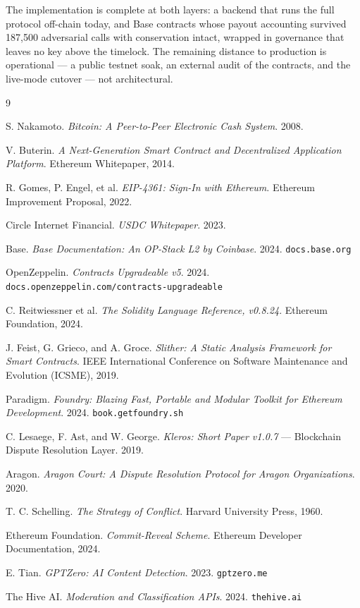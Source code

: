 \documentclass[11pt,letterpaper]{article}
\begin{document}
The implementation is complete at both layers: a backend that runs the full protocol
off-chain today, and Base contracts whose payout accounting survived 187{,}500
adversarial calls with conservation intact, wrapped in governance that leaves no key
above the timelock. The remaining distance to production is operational --- a public
testnet soak, an external audit of the contracts, and the live-mode cutover --- not
architectural.

\begin{thebibliography}{9}\small

 S. Nakamoto. \emph{Bitcoin: A Peer-to-Peer Electronic Cash
System}. 2008.

 V. Buterin. \emph{A Next-Generation Smart Contract and
Decentralized Application Platform}. Ethereum Whitepaper, 2014.

 R. Gomes, P. Engel, et al. \emph{EIP-4361: Sign-In with Ethereum}.
Ethereum Improvement Proposal, 2022.

 Circle Internet Financial. \emph{USDC Whitepaper}. 2023.

 Base. \emph{Base Documentation: An OP-Stack L2 by Coinbase}. 2024.
\texttt{docs.base.org}

 OpenZeppelin. \emph{Contracts Upgradeable v5}. 2024.
\texttt{docs.openzeppelin.com/contracts-upgradeable}

 C. Reitwiessner et al. \emph{The Solidity Language Reference,
v0.8.24}. Ethereum Foundation, 2024.

 J. Feist, G. Grieco, and A. Groce. \emph{Slither: A Static Analysis
Framework for Smart Contracts}. IEEE International Conference on Software Maintenance
and Evolution (ICSME), 2019.

 Paradigm. \emph{Foundry: Blazing Fast, Portable and Modular Toolkit
for Ethereum Development}. 2024. \texttt{book.getfoundry.sh}

 C. Lesaege, F. Ast, and W. George. \emph{Kleros: Short Paper v1.0.7}
--- Blockchain Dispute Resolution Layer. 2019.

 Aragon. \emph{Aragon Court: A Dispute Resolution Protocol for
Aragon Organizations}. 2020.

 T. C. Schelling. \emph{The Strategy of Conflict}. Harvard
University Press, 1960.

 Ethereum Foundation. \emph{Commit-Reveal Scheme}. Ethereum
Developer Documentation, 2024.

 E. Tian. \emph{GPTZero: AI Content Detection}. 2023.
\texttt{gptzero.me}

 The Hive AI. \emph{Moderation and Classification APIs}. 2024.
\texttt{thehive.ai}

\end{thebibliography}
\end{document}
